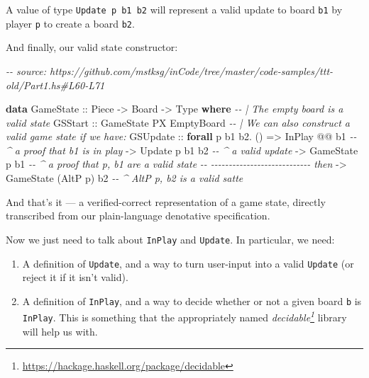 \documentclass[]{article}
\newenvironment{Shaded}{}{}
\newcommand{\CommentTok}[1]{\textcolor[rgb]{0.38,0.63,0.69}{\textit{#1}}}
\newcommand{\DataTypeTok}[1]{\textcolor[rgb]{0.56,0.13,0.00}{#1}}
\newcommand{\KeywordTok}[1]{\textcolor[rgb]{0.00,0.44,0.13}{\textbf{#1}}}
\newcommand{\NormalTok}[1]{#1}
\newcommand{\OperatorTok}[1]{\textcolor[rgb]{0.40,0.40,0.40}{#1}}
\newcommand{\OtherTok}[1]{\textcolor[rgb]{0.00,0.44,0.13}{#1}}
\renewcommand{\href}[2]{#2\footnote{\url{#1}}}
\begin{document}
A value of type \texttt{Update\ p\ b1\ b2} will represent a valid update to
board \texttt{b1} by player \texttt{p} to create a board \texttt{b2}.

And finally, our valid state constructor:

\begin{Shaded}
\begin{Highlighting}[]
\CommentTok{{-}{-} source: https://github.com/mstksg/inCode/tree/master/code{-}samples/ttt{-}old/Part1.hs\#L60{-}L71}

\KeywordTok{data} \DataTypeTok{GameState}\OtherTok{ ::} \DataTypeTok{Piece} \OtherTok{{-}\textgreater{}} \DataTypeTok{Board} \OtherTok{{-}\textgreater{}} \DataTypeTok{Type} \KeywordTok{where}
    \CommentTok{{-}{-} | The empty board is a valid state}
    \DataTypeTok{GSStart}
\OtherTok{        ::} \DataTypeTok{GameState} \DataTypeTok{\textquotesingle{}PX} \DataTypeTok{EmptyBoard}
    \CommentTok{{-}{-} | We can also construct a valid game state if we have:}
    \DataTypeTok{GSUpdate}
\OtherTok{        ::} \KeywordTok{forall}\NormalTok{ p b1 b2}\OperatorTok{.}\NormalTok{ ()}
        \OtherTok{=\textgreater{}} \DataTypeTok{InPlay}          \OperatorTok{@@}\NormalTok{ b1     }\CommentTok{{-}{-} \^{} a proof that b1 is in play}
        \OtherTok{{-}\textgreater{}} \DataTypeTok{Update}\NormalTok{    p        b1 b2  }\CommentTok{{-}{-} \^{} a valid update}
        \OtherTok{{-}\textgreater{}} \DataTypeTok{GameState}\NormalTok{ p        b1     }\CommentTok{{-}{-} \^{} a proof that p, b1 are a valid state}
        \CommentTok{{-}{-} {-}{-}{-}{-}{-}{-}{-}{-}{-}{-}{-}{-}{-}{-}{-}{-}{-}{-}{-}{-}{-}{-}{-}{-}{-}{-}{-}{-} then}
        \OtherTok{{-}\textgreater{}} \DataTypeTok{GameState}\NormalTok{ (}\DataTypeTok{AltP}\NormalTok{ p)    b2  }\CommentTok{{-}{-} \^{} \textasciigrave{}AltP p\textasciigrave{}, b2 is a valid satte}
\end{Highlighting}
\end{Shaded}

And that's it --- a verified-correct representation of a game state, directly
transcribed from our plain-language denotative specification.

Now we just need to talk about \texttt{InPlay} and \texttt{Update}. In
particular, we need:

\begin{enumerate}
\def\labelenumi{\arabic{enumi}.}
\tightlist
\item
  A definition of \texttt{Update}, and a way to turn user-input into a valid
  \texttt{Update} (or reject it if it isn't valid).
\item
  A definition of \texttt{InPlay}, and a way to decide whether or not a given
  board \texttt{b} is \texttt{InPlay}. This is something that the appropriately
  named \emph{\href{https://hackage.haskell.org/package/decidable}{decidable}}
  library will help us with.
\end{enumerate}
\end{document}
